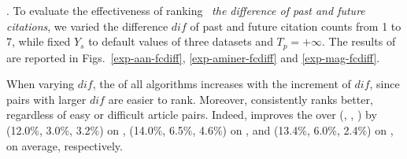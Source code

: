 .
To evaluate the effectiveness of ranking \wrt\ {\em the difference of past and future citations},
we varied the difference $dif$ of past and future citation counts from 1 to 7, while fixed $Y_s$ to default values of three datasets and $T_p=+\infty$. The results of \PairAcc are reported in Figs.~\ref{exp-aan-fcdiff}, \ref{exp-aminer-fcdiff} and \ref{exp-mag-fcdiff}.

When varying $dif$, the \PairAcc of all algorithms increases with the increment of $dif$, since pairs with larger $dif$ are easier to rank. Moreover, \ensemblerank consistently ranks better, regardless of easy or difficult article pairs. Indeed, \ensemblerank improves the \PairAcc over (\pagerank, \futurerank, \hhgrank) by (12.0\%, 3.0\%, 3.2\%) on \aan, (14.0\%, 6.5\%, 4.6\%) on \aminer, and (13.4\%, 6.0\%, 2.4\%) on \magdata, on average, respectively.




